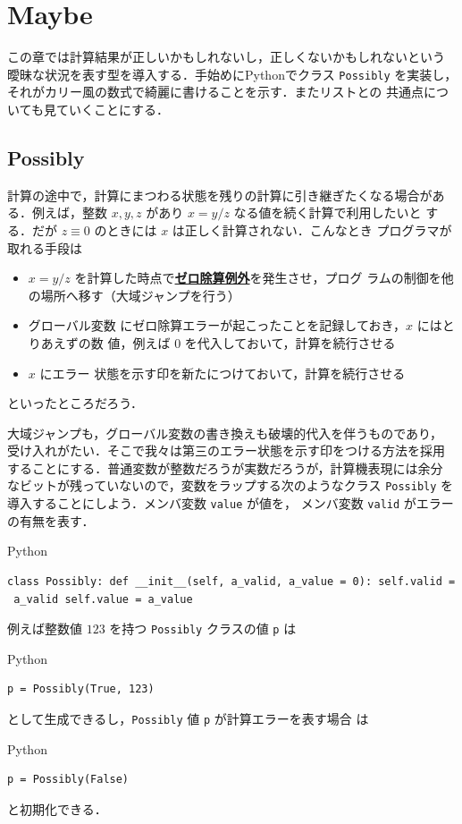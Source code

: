 \documentclass[a5paper,twoside,fleqn]{jsbook}
\newcommand{\programminglanguage}[1]{\textsf{#1}}
\newcommand{\python}{\programminglanguage{Python}}
\newenvironment{leader}{\begingroup\gt}{\endgroup}
\newcommand{\keyword}[1]{{\underline{\textbf{#1}}}}
\newcommand{\code}[1]{\texttt{#1}}
\newenvironment{pythoncode}{\begin{itembox}[r]{\python}}{\end{itembox}}
\begin{document}
\chapter{Maybe}

\begin{leader}
この章では計算結果が正しいかもしれないし，正しくないかもしれないという
曖昧な状況を表す型を導入する．手始めに\python でクラス \code{Possibly}
を実装し，それがカリー風の数式で綺麗に書けることを示す．またリストとの
共通点についても見ていくことにする．
\end{leader}

\section{Possibly}

計算の途中で，計算にまつわる状態を残りの計算に引き継ぎたくなる場合があ
る．例えば，整数 $x,y,z$ があり $x=y/z$ なる値を続く計算で利用したいと
する．だが $z\equiv0$ のときには $x$ は正しく計算されない．こんなとき
プログラマが取れる手段は
\begin{itemize}
\item $x=y/z$ を計算した時点で\keyword{ゼロ除算例外}を発生させ，プログ
  ラムの制御を他の場所へ移す（大域ジャンプを行う）\item グローバル変数
  にゼロ除算エラーが起こったことを記録しておき，$x$ にはとりあえずの数
  値，例えば $0$ を代入しておいて，計算を続行させる\item $x$ にエラー
  状態を示す印を新たにつけておいて，計算を続行させる
\end{itemize}
といったところだろう．

大域ジャンプも，グローバル変数の書き換えも破壊的代入を伴うものであり，
受け入れがたい．そこで我々は第三のエラー状態を示す印をつける方法を採用
することにする．普通変数が整数だろうが実数だろうが，計算機表現には余分
なビットが残っていないので，変数をラップする次のようなクラス
\code{Possibly} を導入することにしよう．メンバ変数 \code{value} が値を，
メンバ変数 \code{valid} がエラーの有無を表す．
\begin{pythoncode}
\begin{verbatim}
class Possibly: def __init__(self, a_valid, a_value = 0): self.valid =
 a_valid self.value = a_value
\end{verbatim}
\end{pythoncode}

例えば整数値 $123$ を持つ \code{Possibly} クラスの値 \code{p} は
\begin{pythoncode}
\begin{verbatim}
p = Possibly(True, 123)
\end{verbatim}
\end{pythoncode}
として生成できるし，\code{Possibly} 値 \code{p} が計算エラーを表す場合
は
\begin{pythoncode}
\begin{verbatim}
p = Possibly(False)
\end{verbatim}
\end{pythoncode}
と初期化できる．
\end{document}
